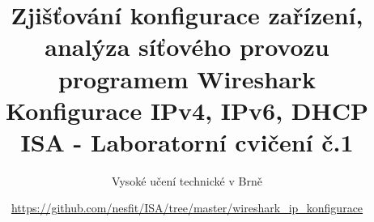 \documentclass[a4paper,11pt]{article}
\title{Zjišťování konfigurace zařízení, analýza síťového provozu programem Wireshark\\
Konfigurace IPv4, IPv6, DHCP\\
{\bf\large ISA - Laboratorní cvičení č.1}}
\author{Vysoké učení technické v Brně}
\date{\url{https://github.com/nesfit/ISA/tree/master/wireshark_ip_konfigurace}}
\begin{document}
{\let\newpage\relax\maketitle}


\end{document}
